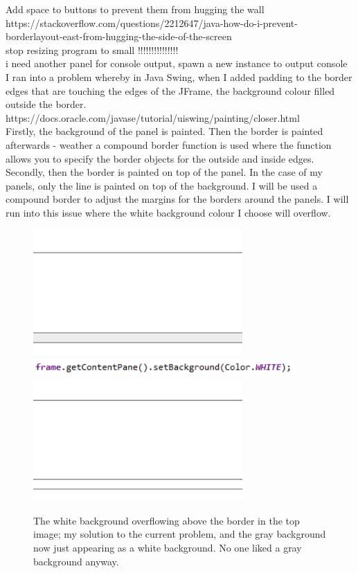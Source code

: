 \documentclass[a4paper, 12pt]{article}
\begin{document}
    Add space to buttons to prevent them from hugging the wall https://stackoverflow.com/questions/2212647/java-how-do-i-prevent-borderlayout-east-from-hugging-the-side-of-the-screen \\

    stop resizing program to small !!!!!!!!!!!!!!! \\
    i need another panel for console output, spawn a new instance to output console \\

    \clearpage
    I ran into a problem whereby in Java Swing, when I added padding to the border edges that
    are touching the edges of the JFrame, the background colour filled outside the border. \\

    https://docs.oracle.com/javase/tutorial/uiswing/painting/closer.html \\

    Firstly, the background of the panel is painted. Then the border is painted afterwards
    - weather a compound border function is used where the function allows you to
    specify the border objects for the outside and inside edges. Secondly, then the border
    is painted on top of the panel. In the case of my panels, only the line is painted on
    top of the background. I will be used a compound border to adjust the margins for the
    borders around the panels. I will run into this issue where the white background colour
    I choose will overflow. \\

    \begin{figure}[h]
        \centering
        \includegraphics[width=80mm]{colour_overfill.png}
        \includegraphics[width=100mm]{overfill_solution.png}
        \includegraphics[width=80mm]{no_overfill.png}
        \caption{The white background overflowing above the border in the top image; my solution
        to the current problem, and the gray background now just appearing as a white background.
        No one liked a gray background anyway.}
    \end{figure}
\end{document}
